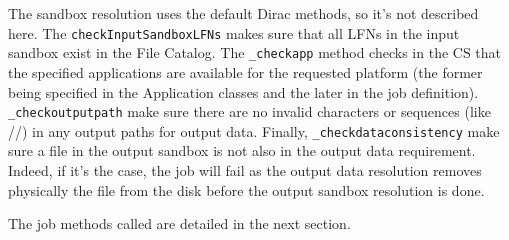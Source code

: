 \documentclass[a4paper,12pt]{article}
\begin{document}
The sandbox resolution uses the default Dirac methods, so it's not described
here. The \lstinline|checkInputSandboxLFNs| makes sure that all LFNs in the
input sandbox exist in the File Catalog. The \lstinline|_checkapp| method checks
in the CS that the specified applications are available for the requested platform (the former
being specified in the Application classes and the later in the job
definition). \lstinline|_checkoutputpath| make sure there are no invalid
characters or sequences (like //) in any output paths for output data. Finally,
\lstinline|_checkdataconsistency| make sure a file in the output sandbox is not
also in the output data requirement. Indeed, if it's the case, the job will fail
as the output data resolution removes physically the file from the disk before
the output sandbox resolution is done.

The job methods called are detailed in the next section.
\end{document}
